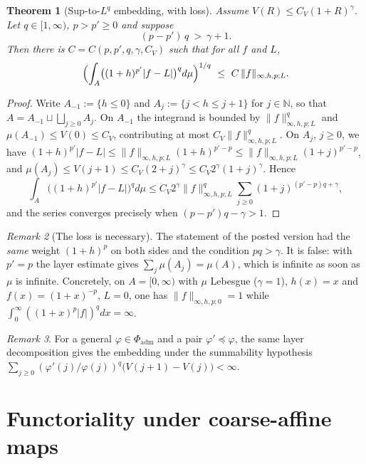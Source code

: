 \documentclass[11pt,a4paper]{article}
\numberwithin{equation}{section}
\theoremstyle{plain}
\newtheorem{theorem}{Theorem}[section]
\theoremstyle{definition}
\theoremstyle{remark}
\newtheorem{remark}[theorem]{Remark}
\newcommand{\N}{\mathbb{N}}
\begin{document}
\begin{theorem}[Sup-to-$L^q$ embedding, with loss]\label{thm:sup-to-Lq}
Assume $V(R)\le C_V(1+R)^{\gamma}$. Let $q\in[1,\infty)$, $p>p'\ge0$ and suppose
\[
(p-p')\,q\ >\ \gamma+1 .
\]
Then there is $C=C(p,p',q,\gamma,C_V)$ such that for all $f$ and $L$,
\[
\Bigl(\int_A\bigl((1+h)^{p'}|f-L|\bigr)^{q}d\mu\Bigr)^{1/q}
\ \le\ C\,\|f\|_{\infty,h,p;L}.
\]
\end{theorem}

\begin{proof}
Write $A_{-1}:=\{h\le0\}$ and $A_j:=\{j<h\le j+1\}$ for $j\in\N$, so that
$A=A_{-1}\sqcup\bigsqcup_{j\ge0}A_j$. On $A_{-1}$ the integrand is bounded by
$\|f\|_{\infty,h,p;L}^{q}$ and $\mu(A_{-1})\le V(0)\le C_V$, contributing at most
$C_V\|f\|_{\infty,h,p;L}^{q}$. On $A_j$, $j\ge0$, we have
$(1+h)^{p'}|f-L|\le\|f\|_{\infty,h,p;L}(1+h)^{p'-p}\le\|f\|_{\infty,h,p;L}(1+j)^{p'-p}$,
and $\mu(A_j)\le V(j+1)\le C_V(2+j)^{\gamma}\le C_V2^{\gamma}(1+j)^{\gamma}$. Hence
\[
\int_A\bigl((1+h)^{p'}|f-L|\bigr)^{q}d\mu
\le C_V2^{\gamma}\|f\|_{\infty,h,p;L}^{q}\sum_{j\ge0}(1+j)^{(p'-p)q+\gamma},
\]
and the series converges precisely when $(p-p')q-\gamma>1$.
\end{proof}

\begin{remark}[The loss is necessary]
The statement of the posted version had the \emph{same} weight $(1+h)^{p}$ on both sides
and the condition $pq>\gamma$. It is false: with $p'=p$ the layer estimate gives
$\sum_j\mu(A_j)=\mu(A)$, which is infinite as soon as $\mu$ is infinite. Concretely, on
$A=[0,\infty)$ with $\mu$ Lebesgue ($\gamma=1$), $h(x)=x$ and $f(x)=(1+x)^{-p}$, $L=0$,
one has $\|f\|_{\infty,h,p;0}=1$ while $\int_0^{\infty}((1+x)^{p}|f|)^{q}dx=\infty$.
\end{remark}

\begin{remark}
For a general $\varphi\in\Phi_{\mathrm{adm}}$ and a pair $\varphi'\preceq\varphi$, the same
layer decomposition gives the embedding under the summability hypothesis
$\sum_{j\ge0}(\varphi'(j)/\varphi(j))^{q}\bigl(V(j+1)-V(j)\bigr)<\infty$.
\end{remark}

\section{Functoriality under coarse-affine maps}
\label{sec:functoriality}
\end{document}
